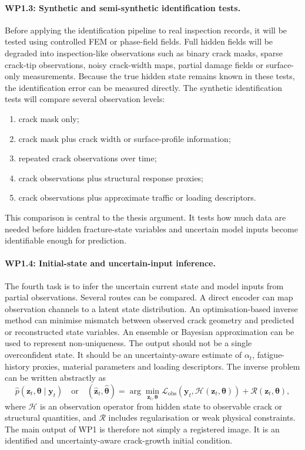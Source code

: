 \paragraph{WP1.3: Synthetic and semi-synthetic identification tests.}
Before applying the identification pipeline to real inspection records, it will be tested using controlled FEM or phase-field fields.
Full hidden fields will be degraded into inspection-like observations such as binary crack masks, sparse crack-tip observations, noisy crack-width maps, partial damage fields or surface-only measurements.
Because the true hidden state remains known in these tests, the identification error can be measured directly.
The synthetic identification tests will compare several observation levels:
\begin{enumerate}
    \item crack mask only;
    \item crack mask plus crack width or surface-profile information;
    \item repeated crack observations over time;
    \item crack observations plus structural response proxies;
    \item crack observations plus approximate traffic or loading descriptors.
\end{enumerate}
This comparison is central to the thesis argument. It tests how much data are needed before hidden fracture-state variables and uncertain model inputs become identifiable enough for prediction.

\paragraph{WP1.4: Initial-state and uncertain-input inference.}
The fourth task is to infer the uncertain current state and model inputs from partial observations.
Several routes can be compared. A direct encoder can map observation channels to a latent state distribution.
An optimisation-based inverse method can minimise mismatch between observed crack geometry and predicted or reconstructed state variables.
An ensemble or Bayesian approximation can be used to represent non-uniqueness. The output should not be a single overconfident state.
It should be an uncertainty-aware estimate of $\alpha_t$, fatigue-history proxies, material parameters and loading descriptors.
The inverse problem can be written abstractly as
\[
    \hat{p}(\mathbf{z}_t,\boldsymbol{\theta}\mid \mathbf{y}_t)
    \quad \mathrm{or} \quad
    (\hat{\mathbf{z}}_t,\hat{\boldsymbol{\theta}})
    = \arg\min_{\mathbf{z}_t,\boldsymbol{\theta}}
    \mathcal{L}_{\mathrm{obs}}(\mathbf{y}_t,\mathcal{H}(\mathbf{z}_t,\boldsymbol{\theta})) + \mathcal{R}(\mathbf{z}_t,\boldsymbol{\theta}),
\]
where $\mathcal{H}$ is an observation operator from hidden state to observable crack or structural quantities, and $\mathcal{R}$ includes regularisation or weak physical constraints.
The main output of WP1 is therefore not simply a registered image.
It is an identified and uncertainty-aware crack-growth initial condition.

